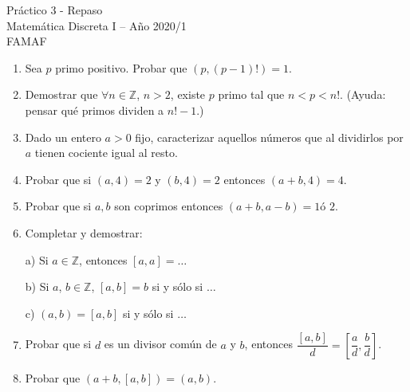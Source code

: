 \documentclass[12pt,spanish,makeidx]{amsbook}
\begin{document}
{\bf \begin{center} Práctico 3 - Repaso \\ Matemática Discreta I -- Año 2020/1 \\ FAMAF\end{center}}


\smallskip

\begin{enumerate}




\item Sea $p$ primo positivo. Probar que $(p,(p-1)!)=1$.

\smallskip

\item Demostrar que $\forall n\in{\mathbb Z}$, $n>2$, existe $p$ primo tal que $n<p<n!$. (Ayuda: pensar qu\'e primos dividen a $n! - 1$.)



\smallskip

\item Dado un entero $a>0$ fijo, caracterizar aquellos n\'umeros que al dividirlos por $a$ tienen cociente igual al resto.

\smallskip


\item Probar que si $(a,4)=2$ y $(b,4)=2$ entonces $(a+b,4)=4$.

\smallskip
\item Probar que si $a,b$ son coprimos entonces $(a+b,a-b)=1 \text{
\'o } 2 $.



\smallskip



\item Completar y demostrar:

a) Si $a \in {\mathbb Z}$, entonces $[a,a]=\dots$

b) Si $a$, $b \in {\mathbb Z}$, $[a,b]=b$ si y s\'olo si $\ldots$

c) $(a,b)=[a,b]$ si y s\'olo si $\ldots$


\smallskip

\item Probar que si $d$ es un divisor com\'un de $a$ y $b$, entonces $\dfrac{[a,b]}{d} = \left[\dfrac{a}{d},\dfrac{b}{d}\right]$.



\smallskip

\item Probar que $(a+b,[a,b])=(a,b)$. %


\end{enumerate}
\end{document}
